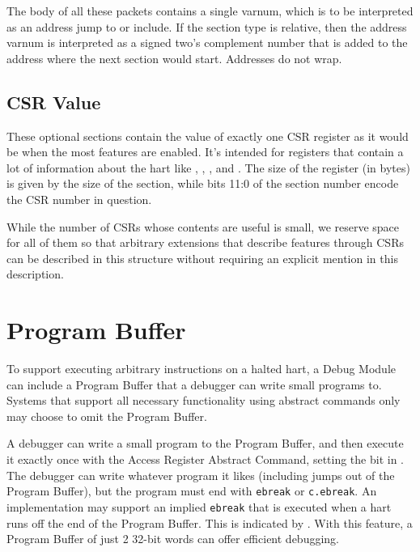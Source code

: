 The body of all these packets contains a single varnum, which is to be
interpreted as an address jump to or include. If the section type is relative,
then the address varnum is interpreted as a signed two's complement number that
is added to the address where the next section would start. Addresses do not
wrap.

\subsection{CSR Value} \label{sectionCsr}

These optional sections contain the value of exactly one CSR register as it
would be when the most features are enabled. It's intended for registers that
contain a lot of information about the hart like \Rmvendorid, \Rmarchid,
\Rmimpid, and \Rmisa. The size of the register (in bytes) is given by the size
of the section, while bits 11:0 of the section number encode the CSR number in
question.

\begin{commentary}
    While the number of CSRs whose contents are useful is small, we reserve
    space for all of them so that arbitrary extensions that describe features
    through CSRs can be described in this structure without requiring an
    explicit mention in this description.
\end{commentary}

\section{Program Buffer} \label{programbuffer}

To support executing arbitrary instructions on a halted hart,
a Debug Module can include a Program Buffer that a debugger
can write small programs to. Systems
that support all necessary functionality using abstract commands
only may choose to omit the Program Buffer.

A debugger can write a small program to the Program Buffer, and then
execute it exactly once with the Access Register Abstract Command,
setting the \FacAccessregisterPostexec bit in \RdmCommand.
The debugger can write whatever program it likes (including jumps out of the
Program Buffer), but the program must end with
{\tt ebreak} or {\tt c.ebreak}. An implementation may support
an implied {\tt ebreak} that is executed when a hart runs off the end of the
Program Buffer. This is indicated by \FdmDmstatusImpebreak. With this feature, a Program
Buffer of just 2 32-bit words can offer efficient debugging.


